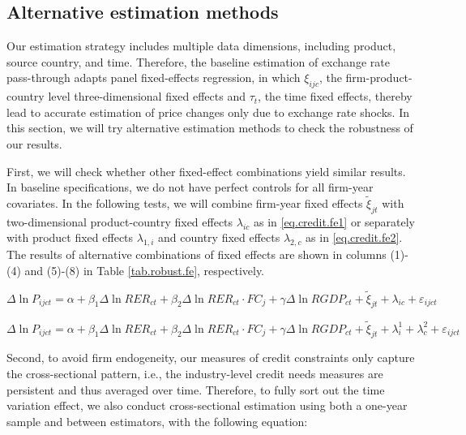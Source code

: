 \subsection{Alternative estimation methods}

Our estimation strategy includes multiple data dimensions, including product, source country, and time. Therefore, the baseline estimation of exchange rate pass-through adapts panel fixed-effects regression, in which $\xi_{ijc}$, the firm-product-country level three-dimensional fixed effects and $\tau_t$, the time fixed effects, thereby lead to accurate estimation of price changes only due to exchange rate shocks. In this section, we will try alternative estimation methods to check the robustness of our results.

First, we will check whether other fixed-effect combinations yield similar results. In baseline specifications, we do not have perfect controls for all firm-year covariates. In the following tests, we will combine firm-year fixed effects $\tilde{\xi}_{jt}$ with two-dimensional product-country fixed effects $\lambda_{ic}$ as in \ref{eq.credit.fe1} or separately with product fixed effects $\lambda_{1, i}$ and country fixed effects $\lambda_{2, c}$ as in \ref{eq.credit.fe2}. The results of alternative combinations of fixed effects are shown in columns (1)-(4) and (5)-(8) in Table \ref{tab.robust.fe}, respectively. 

\begin{equation}
    \Delta \ln P_{ijct}=\alpha+\beta_{1} \Delta \ln RER_{ct}+\beta_{2} \Delta \ln RER_{ct} \cdot FC_{j}+\gamma \Delta \ln RGDP_{ct}+\tilde{\xi}_{jt}+\lambda_{ic}+\varepsilon_{ijct}
	\label{eq.credit.fe1}
\end{equation}

\begin{equation}
    \Delta \ln P_{ijct}=\alpha+\beta_{1} \Delta \ln RER_{ct}+\beta_{2} \Delta \ln RER_{ct} \cdot FC_{j}+\gamma \Delta \ln RGDP_{ct}+\tilde{\xi}_{jt}+\lambda^1_{i} + \lambda^2_{c} +\varepsilon_{ijct}
	\label{eq.credit.fe2}
\end{equation}

Second, to avoid firm endogeneity, our measures of credit constraints only capture the cross-sectional pattern, i.e., the industry-level credit needs measures are persistent and thus averaged over time. Therefore, to fully sort out the time variation effect, we also conduct cross-sectional estimation using both a one-year sample and between estimators, with the following equation:

